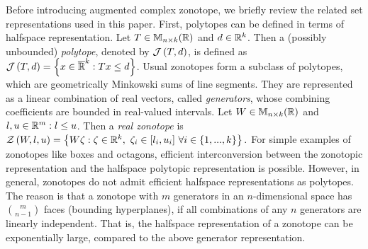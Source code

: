 
Before introducing augmented complex zonotope, we briefly review the
related set representations used in this paper. First,
polytopes can be defined in terms of halfspace representation.
%
Let $T\in\mathbb{M}_{n\times k}(\mathbb{\mathbb{R}})$ and $d\in\mathbb{R}^k$.  Then a (possibly
unbounded) \emph{polytope}, denoted by $\mathcal{J}\left(T,d\right)$, is defined as
$\mathcal{J}\left(T,d\right) = \left\{x\in\mathbb{\overline{R}}^k: Tx\leq d\right\}$.
%
Usual zonotopes form a subclass of polytopes, which are geometrically
Minkowski sums of line segments. They are represented as a linear
combination of real vectors, called \emph{generators}, whose combining
coefficients are bounded in real-valued intervals.
Let $W\in\mathbb{M}_{n\times k}(\mathbb{\mathbb{R}})$ and $l,u\in\mathbb{R}^m: l\leq u$.  Then 
 a \emph{real zonotope} is
$\mathcal{Z}\left(W,l,u\right) = \left\{W\zeta: \zeta\in\mathbb{R}^k,~\zeta_i\in[l_i,u_i]~\forall i\in \{1,...,k\}\right\}.$
%
For simple examples of zonotopes like boxes and octagons, efficient
interconversion between the zonotopic representation and the halfspace
polytopic representation is possible.  However, in general, zonotopes
do not admit efficient halfspace representations as polytopes. The
reason is that a zonotope with $m$ generators in an $n$-dimensional
space has ${m}\choose{n-1}$ faces (bounding hyperplanes), if all
combinations of any $n$ generators are linearly independent. That is, the
halfspace representation of a zonotope can be exponentially large,
compared to the above generator representation.

